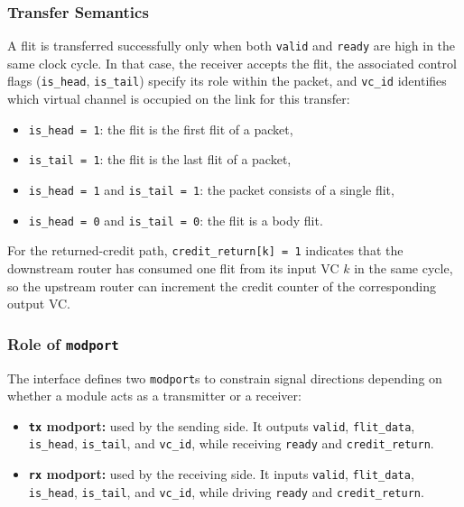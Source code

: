 \documentclass[11pt,a4paper]{article}
\begin{document}
\subsubsection{Transfer Semantics}

A flit is transferred successfully only when both \texttt{valid} and \texttt{ready} are high in the same clock cycle. In that case, the receiver accepts the flit, the associated control flags (\texttt{is\_head}, \texttt{is\_tail}) specify its role within the packet, and \texttt{vc\_id} identifies which virtual channel is occupied on the link for this transfer:
\begin{itemize}
    \item \texttt{is\_head = 1}: the flit is the first flit of a packet,
    \item \texttt{is\_tail = 1}: the flit is the last flit of a packet,
    \item \texttt{is\_head = 1} and \texttt{is\_tail = 1}: the packet consists of a single flit,
    \item \texttt{is\_head = 0} and \texttt{is\_tail = 0}: the flit is a body flit.
\end{itemize}
For the returned-credit path, \texttt{credit\_return[k] = 1} indicates that the downstream router has consumed one flit from its input VC \(k\) in the same cycle, so the upstream router can increment the credit counter of the corresponding output VC.

\subsubsection{Role of \texttt{modport}}

The interface defines two \texttt{modport}s to constrain signal directions depending on whether a module acts as a transmitter or a receiver:

\begin{itemize}
    \item \textbf{\texttt{tx} modport:} used by the sending side. It outputs \texttt{valid}, \texttt{flit\_data}, \texttt{is\_head}, \texttt{is\_tail}, and \texttt{vc\_id}, while receiving \texttt{ready} and \texttt{credit\_return}.
    \item \textbf{\texttt{rx} modport:} used by the receiving side. It inputs \texttt{valid}, \texttt{flit\_data}, \texttt{is\_head}, \texttt{is\_tail}, and \texttt{vc\_id}, while driving \texttt{ready} and \texttt{credit\_return}.
\end{itemize}
\end{document}
